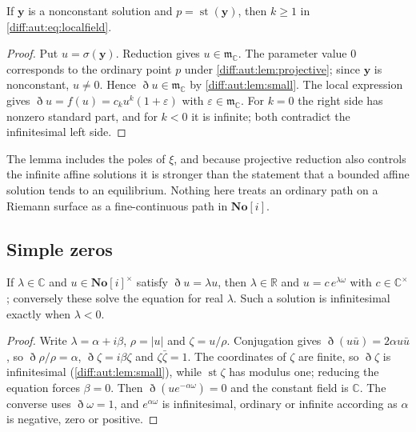 \documentclass[11pt,letterpaper]{article}
\numberwithin{equation}{section}
\theoremstyle{definition}
\theoremstyle{remark}
\newcommand{\SC}{\mathbf{No}[i]}
\newcommand{\R}{\mathbb R}
\newcommand{\C}{\mathbb C}
\newcommand{\mm}{\mathfrak m}
\newcommand{\st}{\operatorname{st}}
\newcommand{\abs}[1]{\lvert#1\rvert}
\newcommand{\Dn}{\eth}
\begin{document}
\begin{lemma}
\label{diff:aut:lem:zero}
If $\mathbf y$ is a nonconstant solution and $p=\st(\mathbf y)$, then $k\geq1$ in
\cref{diff:aut:eq:localfield}.
\end{lemma}
\begin{proof}
Put $u=\sigma(\mathbf y)$. Reduction gives $u\in\mm_{\C}$.
The parameter value $0$ corresponds to the ordinary point $p$ under
\cref{diff:aut:lem:projective}; since $\mathbf y$ is nonconstant,
$u\neq0$. Hence $\Dn u\in\mm_{\C}$ by \cref{diff:aut:lem:small}. The local
expression gives $\Dn u=f(u)=c_{k}u^{k}(1+\varepsilon)$ with $\varepsilon\in\mm_{\C}$.
For $k=0$ the right side has nonzero standard part, and for $k<0$ it is
infinite; both contradict the infinitesimal left side.
\end{proof}

The lemma includes the poles of $\xi$, and because projective reduction also
controls the infinite affine solutions it is stronger than the statement that a
bounded affine solution tends to an equilibrium. Nothing here treats an ordinary
path on a Riemann surface as a fine-continuous path in $\SC$.

\subsection{Simple zeros}
\label{diff:aut:sub:simple}

\begin{lemma}
\label{diff:aut:lem:eigen}
If $\lambda\in\C$ and $u\in\SC^{\times}$ satisfy $\Dn u=\lambda u$, then
$\lambda\in\R$ and $u=c\,e^{\lambda\omega}$ with $c\in\C^{\times}$; conversely these
solve the equation for real $\lambda$. Such a solution is infinitesimal exactly
when $\lambda<0$.
\end{lemma}
\begin{proof}
Write $\lambda=\alpha+i\beta$, $\rho=\abs u$ and $\zeta=u/\rho$. Conjugation gives
$\Dn(u\bar u)=2\alpha u\bar u$, so $\Dn\rho/\rho=\alpha$, $\Dn\zeta=i\beta\zeta$ and
$\zeta\bar\zeta=1$. The coordinates of $\zeta$ are finite, so $\Dn\zeta$ is
infinitesimal (\cref{diff:aut:lem:small}), while $\st\zeta$ has modulus one;
reducing the equation forces $\beta=0$. Then $\Dn(ue^{-\alpha\omega})=0$ and the
constant field is $\C$. The converse uses $\Dn\omega=1$, and $e^{\alpha\omega}$ is
infinitesimal, ordinary or infinite according as $\alpha$ is negative, zero or
positive.
\end{proof}
\end{document}

